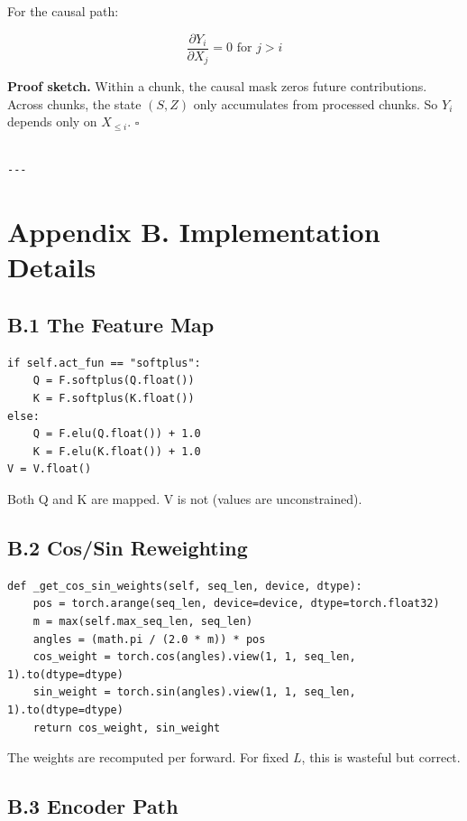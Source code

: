For the causal path:

\[
\frac{\partial Y_i}{\partial X_j} = 0 \text{ for } j > i
\]

\textbf{Proof sketch.} Within a chunk, the causal mask zeros future contributions. 
Across chunks, the state $(S, Z)$ only accumulates from processed chunks. 
So $Y_i$ depends only on $X_{\leq i}$. $\square$
\begin{lstlisting}

---
\end{lstlisting}


\section{Appendix B. Implementation Details}

\subsection{B.1 The Feature Map}

\begin{lstlisting}
if self.act_fun == "softplus":
    Q = F.softplus(Q.float())
    K = F.softplus(K.float())
else:
    Q = F.elu(Q.float()) + 1.0
    K = F.elu(K.float()) + 1.0
V = V.float()
\end{lstlisting}

Both Q and K are mapped. V is not (values are unconstrained).

\subsection{B.2 Cos/Sin Reweighting}

\begin{lstlisting}
def _get_cos_sin_weights(self, seq_len, device, dtype):
    pos = torch.arange(seq_len, device=device, dtype=torch.float32)
    m = max(self.max_seq_len, seq_len)
    angles = (math.pi / (2.0 * m)) * pos
    cos_weight = torch.cos(angles).view(1, 1, seq_len, 1).to(dtype=dtype)
    sin_weight = torch.sin(angles).view(1, 1, seq_len, 1).to(dtype=dtype)
    return cos_weight, sin_weight
\end{lstlisting}

The weights are recomputed per forward. For fixed $L$, this is wasteful 
but correct.

\subsection{B.3 Encoder Path}

